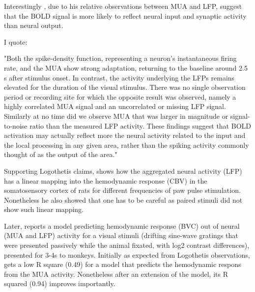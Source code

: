 
Interestingly \citep{logothetis_neurophysiological_2001}, due to his relative observations between MUA and LFP, suggest that the BOLD signal is more likely to reflect neural input and synaptic activity than neural output.

I quote:

"Both the spike-density function, representing a neuron's instantaneous firing rate, and the MUA show strong adaptation, returning to the baseline around 2.5 s after stimulus onset. In contrast, the activity underlying the LFPs remains elevated for the duration of the visual stimulus. There was no single observation period or recording site for which the opposite result was observed, namely a highly correlated MUA signal and an uncorrelated or missing LFP signal. Similarly at no time did we observe MUA that was larger in magnitude or signal-to-noise ratio than the measured LFP activity. These findings suggest that BOLD activation may actually reflect more the neural activity related to the input and the local processing in any given area, rather than the spiking activity commonly thought of as the output of the area."

Supporting Logothetis claims, \citep{martindale_hemodynamic_2003} shows how the aggregated neural activity (LFP) has a linear mapping into the hemodynamic response (CBV) in the somatosensory cortex of rats for different frequencies of paw pulse stimulation. Nonetheless he also showed that one has to be careful as paired stimuli did not show such linear mapping.



Later, \citep{cardoso_neuroimaging_2012} reports a model predicting hemodynamic response (BVC) out of neural (MUA and LFP) activity for a visual stimuli (drifting sine-wave gratings that were presented passively while the animal fixated, with log2 contrast differences), presented for 3-4s to monkeys. Initially as expected from Logothetis observations, \citep{cardoso_neuroimaging_2012} gets a low R square (0.49) for a model that predicts the hemodynamic respons from the MUA activity. Nonetheless after an extension of the model, its R squared (0.94) improves importantly.

